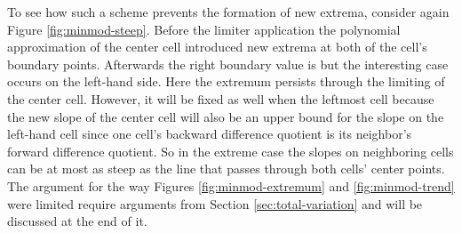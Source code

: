 To see how such a scheme prevents the formation of new extrema, consider again Figure \ref{fig:minmod-steep}.
Before the limiter application the polynomial approximation of the center cell introduced new extrema at both of the cell's boundary points.
Afterwards the right boundary value is  but the interesting case occurs on the left-hand side.
Here the extremum persists through the limiting of the center cell.
However, it will be fixed as well when  the leftmost cell because the new slope of the center cell will also be an upper bound for the slope on the left-hand cell since one cell's backward difference quotient is its neighbor's forward difference quotient.
So in the extreme case the slopes on neighboring cells can be at most as steep as the line that passes through both cells' center points.
The argument for the way Figures \ref{fig:minmod-extremum} and \ref{fig:minmod-trend} were limited require arguments from Section \ref{sec:total-variation} and will be discussed at the end of it.
